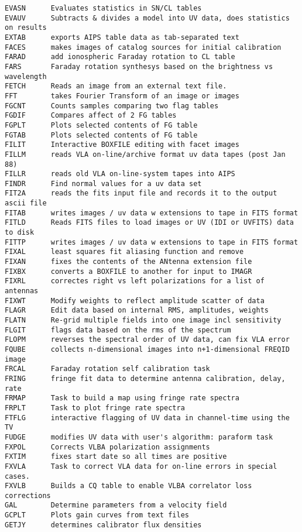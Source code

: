 \begin{verbatim}
EVASN      Evaluates statistics in SN/CL tables
EVAUV      Subtracts & divides a model into UV data, does statistics on results
EXTAB      exports AIPS table data as tab-separated text
FACES      makes images of catalog sources for initial calibration
FARAD      add ionospheric Faraday rotation to CL table
FARS       Faraday rotation synthesys based on the brightness vs wavelength
FETCH      Reads an image from an external text file.
FFT        takes Fourier Transform of an image or images
FGCNT      Counts samples comparing two flag tables
FGDIF      Compares affect of 2 FG tables
FGPLT      Plots selected contents of FG table
FGTAB      Plots selected contents of FG table
FILIT      Interactive BOXFILE editing with facet images
FILLM      reads VLA on-line/archive format uv data tapes (post Jan 88)
FILLR      reads old VLA on-line-system tapes into AIPS
FINDR      Find normal values for a uv data set
FIT2A      reads the fits input file and records it to the output ascii file
FITAB      writes images / uv data w extensions to tape in FITS format
FITLD      Reads FITS files to load images or UV (IDI or UVFITS) data to disk
FITTP      writes images / uv data w extensions to tape in FITS format
FIXAL      least squares fit aliasing function and remove
FIXAN      fixes the contents of the ANtenna extension file
FIXBX      converts a BOXFILE to another for input to IMAGR
FIXRL      correctes right vs left polarizations for a list of antennas
FIXWT      Modify weights to reflect amplitude scatter of data
FLAGR      Edit data based on internal RMS, amplitudes, weights
FLATN      Re-grid multiple fields into one image incl sensitivity
FLGIT      flags data based on the rms of the spectrum
FLOPM      reverses the spectral order of UV data, can fix VLA error
FQUBE      collects n-dimensional images into n+1-dimensional FREQID image
FRCAL      Faraday rotation self calibration task
FRING      fringe fit data to determine antenna calibration, delay, rate
FRMAP      Task to build a map using fringe rate spectra
FRPLT      Task to plot fringe rate spectra
FTFLG      interactive flagging of UV data in channel-time using the TV
FUDGE      modifies UV data with user's algorithm: paraform task
FXPOL      Corrects VLBA polarization assignments
FXTIM      fixes start date so all times are positive
FXVLA      Task to correct VLA data for on-line errors in special cases.
FXVLB      Builds a CQ table to enable VLBA correlator loss corrections
GAL        Determine parameters from a velocity field
GCPLT      Plots gain curves from text files
GETJY      determines calibrator flux densities

\end{verbatim}
